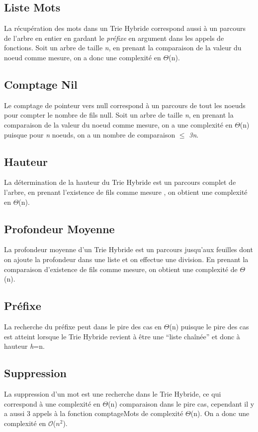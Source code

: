 \documentclass[a4paper,12pt]{report}
\begin{document}
\subsection{Liste Mots}
La récupération des mots dans un Trie Hybride correspond aussi à un parcours de l'arbre en entier en gardant le \textit{préfixe}
en argument dans les appels de fonctions.
Soit un arbre de taille \textit{n}, en prenant la comparaison de la valeur du noeud comme mesure,
on a donc une complexité en $\Theta$(n).
\subsection{Comptage Nil}
Le comptage de pointeur vers null correspond à un parcours de tout les noeuds pour compter le nombre de fils null.
Soit un arbre de taille \textit{n}, en prenant la comparaison de la valeur du noeud comme mesure,
on a une complexité en $\Theta$(n) puisque pour \textit{n} noeuds, on a un nombre de comparaison $\le$ \textit{3n}.
\subsection{Hauteur}
La détermination de la hauteur du Trie Hybride est un parcours complet de l'arbre, en prenant l'existence de fils comme mesure
, on obtient une complexité en $\Theta$(n).
\subsection{Profondeur Moyenne}
La profondeur moyenne d'un Trie Hybride est un parcours jusqu'aux feuilles dont on ajoute la profondeur dans une liste et on effectue
une division. En prenant la comparaison d'existence de fils comme mesure, on obtient une complexité de $\Theta$(n).
\subsection{Préfixe}
La recherche du préfixe peut dans le pire des cas en $\Theta$(n) puisque le pire des cas est atteint lorsque le Trie Hybride
revient à être une ``liste chaînée'' et donc à hauteur \textit{h}=n.
\subsection{Suppression}
La suppression d'un mot est une recherche dans le Trie Hybride, ce qui correspond à une complexité en $\Theta$(n) comparaison
dans le pire cas, cependant il y a aussi 3 appels à la fonction comptageMots de complexité $\Theta$(n).
On a donc une complexité en $\mathcal{O}$($n^2$).
\end{document}
